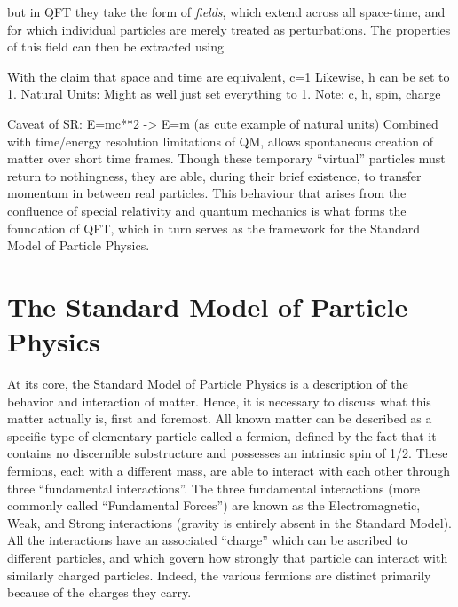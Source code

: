     
        but in QFT they take the form of \textit{fields}, which extend across all space-time,
        and for which individual particles are merely treated as perturbations.
    The properties of this field can then be extracted using 






    With the claim that space and time are equivalent, c=1
    Likewise, h can be set to 1.
    Natural Units: Might as well just set everything to 1.
    Note: c, h, spin, charge

    Caveat of SR: E=mc**2 -> E=m (as cute example of natural units)
    Combined with time/energy resolution limitations of QM,
        allows spontaneous creation of matter over short time frames.
    Though these temporary ``virtual'' particles must return to nothingness,
        they are able, during their brief existence,
        to transfer momentum in between real particles.
    This behaviour that arises from the confluence of special relativity and quantum mechanics is
        what forms the foundation of QFT,
        which in turn serves as the framework for the Standard Model of Particle Physics.


\section{The Standard Model of Particle Physics}\label{sec:standard_model}
    
    At its core, the Standard Model of Particle Physics is a description of the behavior and interaction of matter.
    Hence, it is necessary to discuss what this matter actually is, first and foremost.
    All known matter can be described as a specific type of elementary particle called a fermion,
        defined by the fact that it contains no discernible substructure and possesses an intrinsic spin of 1/2.
    These fermions, each with a different mass, are able to interact with each other through three ``fundamental interactions''.
    The three fundamental interactions (more commonly called ``Fundamental Forces'') are known as
        the Electromagnetic, Weak, and Strong interactions (gravity is entirely absent in the Standard Model).
    All the interactions have an associated ``charge'' which can be ascribed to different particles,
        and which govern how strongly that particle can interact with similarly charged particles.
    Indeed, the various fermions are distinct primarily because of the charges they carry.

